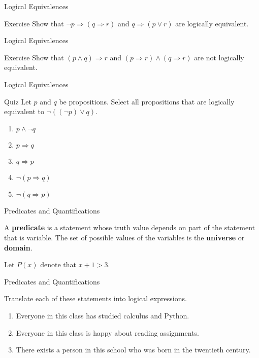 \documentclass{beamer}
\begin{document}
\begin{frame}[t]{Logical Equivalences}
    \begin{block}{Exercise}
        Show that $\neg p \Rightarrow (q \Rightarrow r)$ and $q \Rightarrow (p \vee r)$ are logically equivalent.
    \end{block}
\end{frame}

\begin{frame}[t]{Logical Equivalences}
    \begin{block}{Exercise}
        Show that $(p \wedge q) \Rightarrow r$ and $(p \Rightarrow r) \wedge (q \Rightarrow r)$ are not logically equivalent.
    \end{block}
\end{frame}

\begin{frame}[t]{Logical Equivalences}
    \begin{block}{Quiz}
        Let $p$ and $q$ be propositions. Select all propositions that are logically equivalent to $\neg ((\neg p) \vee q)$.
        \begin{enumerate}[a]
            \item $p \wedge \neg q$
            \item $p \Rightarrow q$
            \item $q \Rightarrow p$
            \item $\neg (p \Rightarrow q)$
            \item $\neg (q \Rightarrow p)$
        \end{enumerate}
    \end{block}
\end{frame}

\begin{frame}[t]{Predicates and Quantifications}
    \begin{definition}
        A \textbf{predicate} is a statement whose truth value depends on part of the statement that is variable. The set of possible values of the variables is the \textbf{universe} or \textbf{domain}. 
    \end{definition}
    \begin{example}
        Let $P(x)$ denote that $x + 1 >3$.
    \end{example}
\end{frame}

\begin{frame}[t]{Predicates and Quantifications}
    \begin{example}
        Translate each of these statements into logical expressions.
        \begin{enumerate}
            \item Everyone in this class has studied calculus and Python.
            \item Everyone in this class is happy about reading assignments.
            \item There exists a person in this school who was born in the twentieth century. 
        \end{enumerate}
    \end{example}
\end{frame}
\end{document}
